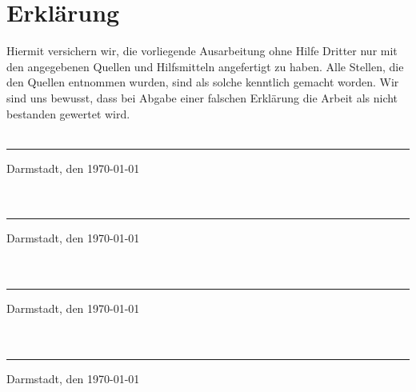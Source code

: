 \section*{Erklärung}

Hiermit versichern wir, die vorliegende Ausarbeitung ohne Hilfe Dritter nur mit den angegebenen Quellen und Hilfsmitteln angefertigt zu haben. Alle Stellen, die den Quellen entnommen wurden, sind als solche kenntlich gemacht worden. Wir sind uns bewusst, dass bei Abgabe einer falschen Erklärung die Arbeit als nicht bestanden gewertet wird. \\ \\

\rule{5cm}{.4pt}\par
Darmstadt, den \today\\ \\  \\

\rule{5cm}{.4pt}\par
Darmstadt, den \today \\ \\ \\

\rule{5cm}{.4pt}\par
Darmstadt, den \today\\ \\ \\

\rule{5cm}{.4pt}\par
Darmstadt, den \today

%
%
%



